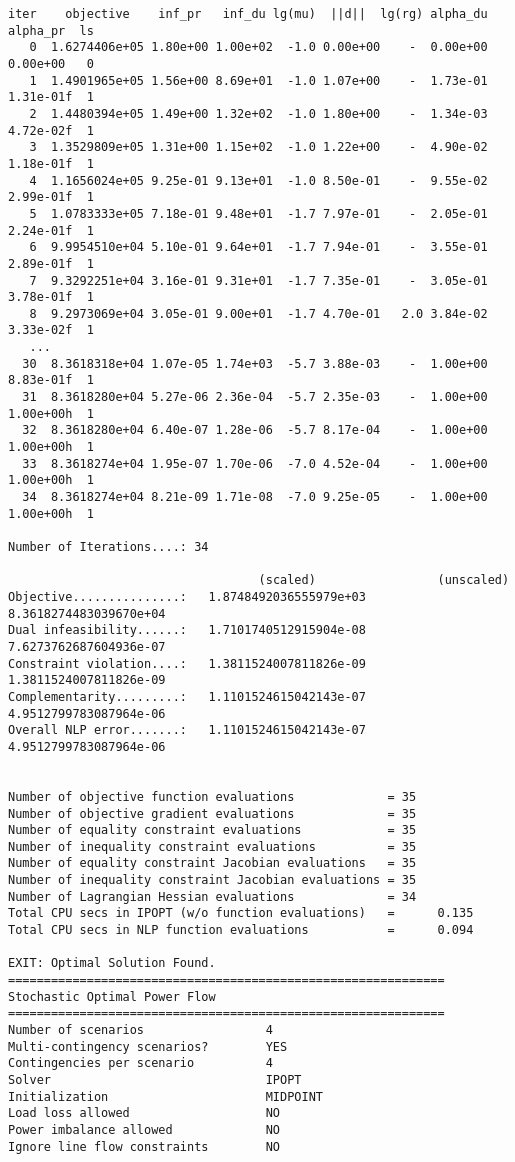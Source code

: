 \begin{lstlisting}
iter    objective    inf_pr   inf_du lg(mu)  ||d||  lg(rg) alpha_du alpha_pr  ls
   0  1.6274406e+05 1.80e+00 1.00e+02  -1.0 0.00e+00    -  0.00e+00 0.00e+00   0
   1  1.4901965e+05 1.56e+00 8.69e+01  -1.0 1.07e+00    -  1.73e-01 1.31e-01f  1
   2  1.4480394e+05 1.49e+00 1.32e+02  -1.0 1.80e+00    -  1.34e-03 4.72e-02f  1
   3  1.3529809e+05 1.31e+00 1.15e+02  -1.0 1.22e+00    -  4.90e-02 1.18e-01f  1
   4  1.1656024e+05 9.25e-01 9.13e+01  -1.0 8.50e-01    -  9.55e-02 2.99e-01f  1
   5  1.0783333e+05 7.18e-01 9.48e+01  -1.7 7.97e-01    -  2.05e-01 2.24e-01f  1
   6  9.9954510e+04 5.10e-01 9.64e+01  -1.7 7.94e-01    -  3.55e-01 2.89e-01f  1
   7  9.3292251e+04 3.16e-01 9.31e+01  -1.7 7.35e-01    -  3.05e-01 3.78e-01f  1
   8  9.2973069e+04 3.05e-01 9.00e+01  -1.7 4.70e-01   2.0 3.84e-02 3.33e-02f  1
   ...
  30  8.3618318e+04 1.07e-05 1.74e+03  -5.7 3.88e-03    -  1.00e+00 8.83e-01f  1
  31  8.3618280e+04 5.27e-06 2.36e-04  -5.7 2.35e-03    -  1.00e+00 1.00e+00h  1
  32  8.3618280e+04 6.40e-07 1.28e-06  -5.7 8.17e-04    -  1.00e+00 1.00e+00h  1
  33  8.3618274e+04 1.95e-07 1.70e-06  -7.0 4.52e-04    -  1.00e+00 1.00e+00h  1
  34  8.3618274e+04 8.21e-09 1.71e-08  -7.0 9.25e-05    -  1.00e+00 1.00e+00h  1

Number of Iterations....: 34

                                   (scaled)                 (unscaled)
Objective...............:   1.8748492036555979e+03    8.3618274483039670e+04
Dual infeasibility......:   1.7101740512915904e-08    7.6273762687604936e-07
Constraint violation....:   1.3811524007811826e-09    1.3811524007811826e-09
Complementarity.........:   1.1101524615042143e-07    4.9512799783087964e-06
Overall NLP error.......:   1.1101524615042143e-07    4.9512799783087964e-06


Number of objective function evaluations             = 35
Number of objective gradient evaluations             = 35
Number of equality constraint evaluations            = 35
Number of inequality constraint evaluations          = 35
Number of equality constraint Jacobian evaluations   = 35
Number of inequality constraint Jacobian evaluations = 35
Number of Lagrangian Hessian evaluations             = 34
Total CPU secs in IPOPT (w/o function evaluations)   =      0.135
Total CPU secs in NLP function evaluations           =      0.094

EXIT: Optimal Solution Found.
=============================================================
Stochastic Optimal Power Flow
=============================================================
Number of scenarios                 4
Multi-contingency scenarios?        YES
Contingencies per scenario          4
Solver                              IPOPT
Initialization                      MIDPOINT
Load loss allowed                   NO
Power imbalance allowed             NO
Ignore line flow constraints        NO


\end{lstlisting}
